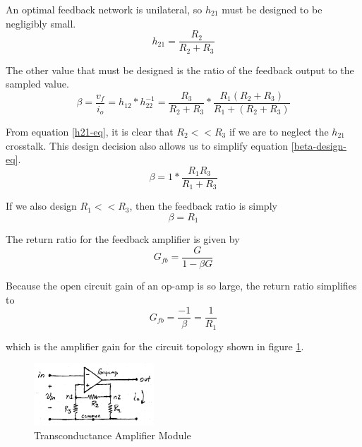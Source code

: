 \documentclass[titlepage, letterpaper, 10.5pt]{article}
\begin{document}
An optimal feedback network is unilateral, so $h_{21}$ must be designed to be negligibly small.
\begin{equation}
h_{21}=\frac{R_{2}}{R_{2}+R_{3}}
\label{h21-eq}
\end{equation}

The other value that must be designed is the ratio of the feedback output to the sampled value.
\begin{equation}
\beta=\frac{v_{f}}{i_{o}}
=h_{12}*h_{22}^{-1}
=\frac{R_{3}}{R_{2}+R_{3}}*\frac{R_{1}(R_{2}+R_{3})}{R_{1}+(R_{2}+R_{3})}
\label{beta-design-eq}
\end{equation}

From equation \ref{h21-eq}, it is clear that $R_{2}<<R_{3}$ if we are to neglect the $h_{21}$ crosstalk.
This design decision also allows us to simplify equation \ref{beta-design-eq}.
\begin{equation*}
\beta=1*\frac{R_{1}R_{3}}{R_{1}+R_{3}}
\end{equation*}

If we also design $R_{1}<<R_{3}$, then the feedback ratio is simply
\begin{equation*}
\beta=R_{1}
\end{equation*}

The return ratio for the feedback amplifier is given by
\begin{equation*}
G_{fb}=\frac{G}{1-\beta G}
\end{equation*}

Because the open circuit gain of an op-amp is so large, the return ratio simplifies to
\begin{equation}
G_{fb}=\frac{-1}{\beta}=\frac{1}{R_{1}}
\label{transconductance-gain-eq}
\end{equation}

which is the amplifier gain for the circuit topology shown in figure \ref{transconductance-amplifier-circuit}.

\begin{figure}[ht]
	\centering
	\includegraphics[width=0.4\textwidth]{diagrams/transconductance-amplifier-circuit}
	\caption{Transconductance Amplifier Module}
	\label{transconductance-amplifier-circuit}
\end{figure}
\end{document}
